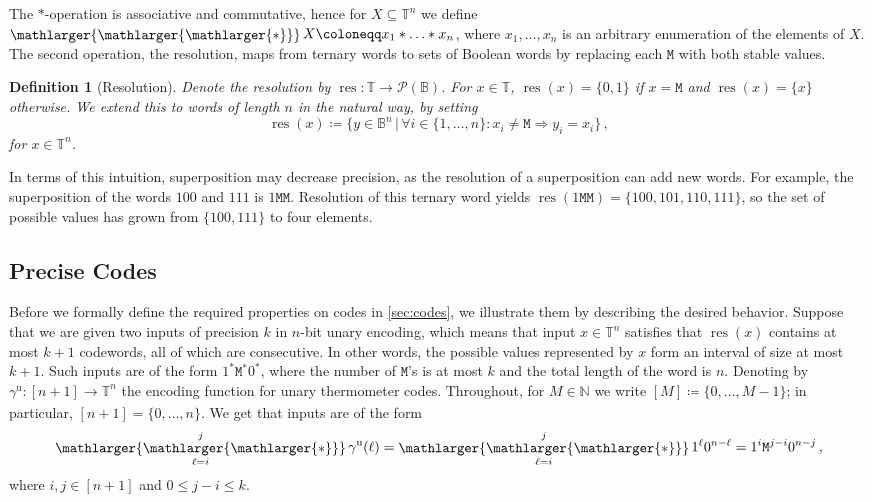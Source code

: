 \documentclass[9pt,journal,compsoc]{IEEEtran}
\newtheorem{definition}[theorem]{Definition}
\theoremstyle{remark}
\DeclareMathOperator{\res}{res}
\newcommand{\bigstarr}{\mathop{\raisebox{-.7pt}{\ensuremath{\mathlarger{\mathlarger{\mathlarger{*}}}}}}}
\newcommand{\mfu}{\mathtt{M}}
\newcommand{\IN}{\mathbb{N}}
\newcommand{\IB}{\mathbb{B}}
\newcommand{\IT}{\mathbb{T}}
\newcommand{\gUnary}[1]{\gamma_{#1}^{\operatorname{u}}}
\begin{document}
The $*$-operation is
associative and commutative, hence for $X\subseteq \IT^n$ we define $\bigstarr
X \coloneqq x_1*\hdots *x_n$, where $x_1,\ldots,x_n$ is an arbitrary
enumeration of the elements of $X$.
The second operation, the resolution, maps from ternary words to
sets of Boolean words by replacing each $\mfu$ with both stable values.

\begin{definition}[Resolution]\label{def:resolution}
Denote the \emph{resolution} by $\res\colon\IT\rightarrow\mathcal{P}(\IB)$.
For $x\in\IT$, $\res(x)=\{0,1\}$ if $x=\mfu$ and $\res(x)=\{x\}$ otherwise.
We extend this to words of length $n$ in the natural way, by setting 
\begin{equation*}
\res(x)\coloneqq \{y\in
\IB^n\,|\,\forall i\in \{1,\ldots,n\}\colon x_i\neq \mfu \Rightarrow
y_i=x_i\}\,,
\end{equation*}
for $x\in \IT^n$.
\end{definition}

In terms of this intuition, superposition may decrease precision, as the resolution of a superposition can add new words. For example, the
superposition of the words $100$ and $111$ is $1\mfu\mfu$. Resolution of this ternary word yields
$\res(1\mfu\mfu)=\{100,101,110,111\}$, so the set of possible values has grown from $\{100,111\}$ to four elements.

\subsection{Precise Codes}

Before we formally define the required properties on codes in \cref{sec:codes}, we illustrate
  them by describing the desired behavior.
Suppose that we are given two inputs of precision $k$ in $n$-bit unary encoding, which
  means that input $x\in \IT^n$ satisfies that $\res(x)$ contains at most $k+1$
  codewords, all of which are consecutive. 
  In other words, the possible values represented by $x$ form an interval of size at most $k+1$. 
Such inputs are of the form $1^*\mfu^*0^*$, where the number of $\mfu$'s is at
most $k$ and the total length of the word is $n$.
Denoting by $\gUnary{}:[n+1]\rightarrow \IT^n$ the encoding function
  for unary thermometer codes. 
  Throughout, for $M \in \IN$ we write $[M] \coloneqq \{0,\ldots,M-1\}$; %
  in particular, $[n+1] = \{0,\ldots,n\}$. 
We get that inputs are of the form
\begin{equation*}
  \bigstarr_{\ell=i}^{j}\gUnary{}(\ell)=\bigstarr_{\ell=i}^{j}1^{\ell}0^{n-\ell}
  =1^i\mfu^{j-i}0^{n-j}\,,
\end{equation*}
  where $i,j\in [n+1]$ and $0\leq j-i\leq k$.
\end{document}
